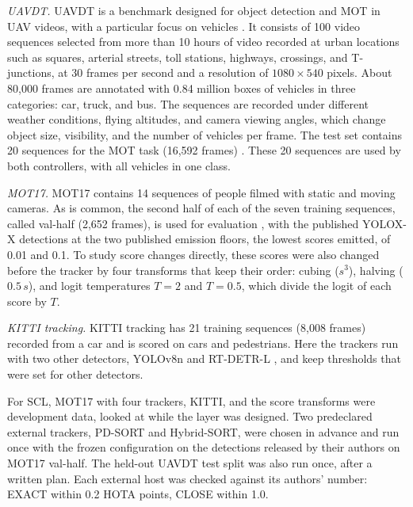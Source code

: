 \emph{UAVDT.} UAVDT is a benchmark designed for object detection and MOT in UAV videos, with a particular focus on vehicles \cite{du2018uavdt}. It consists of 100 video sequences selected from more than 10 hours of video recorded at urban locations such as squares, arterial streets, toll stations, highways, crossings, and T-junctions, at 30 frames per second and a resolution of $1080\times540$ pixels. About 80,000 frames are annotated with 0.84 million boxes of vehicles in three categories: car, truck, and bus. The sequences are recorded under different weather conditions, flying altitudes, and camera viewing angles, which change object size, visibility, and the number of vehicles per frame. The test set contains 20 sequences for the MOT task (16,592 frames) \cite{du2018uavdt}. These 20 sequences are used by both controllers, with all vehicles in one class.

\emph{MOT17.} MOT17 \cite{milan2016mot16} contains 14 sequences of people filmed with static and moving cameras. As is common, the second half of each of the seven training sequences, called val-half (2,652 frames), is used for evaluation \cite{zhang2022bytetrack}, with the published YOLOX-X detections \cite{ge2021yolox} at the two published emission floors, the lowest scores emitted, of 0.01 and 0.1. To study score changes directly, these scores were also changed before the tracker by four transforms that keep their order: cubing ($s^3$), halving ($0.5\,s$), and logit temperatures $T=2$ and $T=0.5$, which divide the logit of each score by $T$.

\emph{KITTI tracking.} KITTI tracking \cite{geiger2012kitti} has 21 training sequences (8,008 frames) recorded from a car and is scored on cars and pedestrians. Here the trackers run with two other detectors, YOLOv8n \cite{jocher2023yolov8} and RT-DETR-L \cite{zhao2024rtdetr}, and keep thresholds that were set for other detectors.

For SCL, MOT17 with four trackers, KITTI, and the score transforms were development data, looked at while the layer was designed. Two predeclared external trackers, PD-SORT and Hybrid-SORT, were chosen in advance and run once with the frozen configuration on the detections released by their authors on MOT17 val-half. The held-out UAVDT test split was also run once, after a written plan. Each external host was checked against its authors' number: EXACT within 0.2 HOTA points, CLOSE within 1.0.

